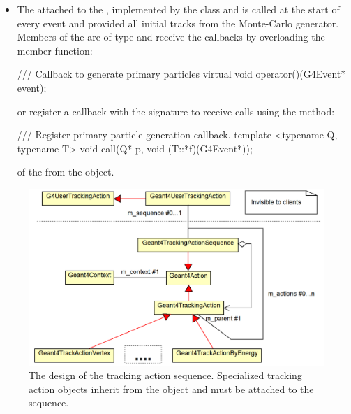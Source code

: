\documentclass[10pt,a4paper]{article}
\begin{document}
\begin{itemize}
\item The  attached to the , implemented 
    by the  class and is called at the start of 
    every event and provided all initial tracks from the Monte-Carlo generator.
    Members of the  are of type
     and receive the callbacks by overloading the member function:
\begin{unnumberedcode}
/// Callback to generate primary particles
virtual void operator()(G4Event* event);
\end{unnumberedcode}
    or register a callback with the signature {}
    to receive calls using the method:
\begin{unnumberedcode}
/// Register primary particle generation callback.
template <typename Q, typename T> void call(Q* p, void (T::*f)(G4Event*));
\end{unnumberedcode}
    of the  from the  object.

\end{itemize}
\begin{figure}[t]
  \begin{center}
    \includegraphics[width=160mm] {DDG4-TrackingAction.png}
    \caption{The design of the tracking action sequence. Specialized 
               tracking action objects inherit from the 
               object and must be attached to the sequence.}
    \label{fig:ddg4-implementation-tracking-action}
  \end{center}
\end{figure}
\end{document}

